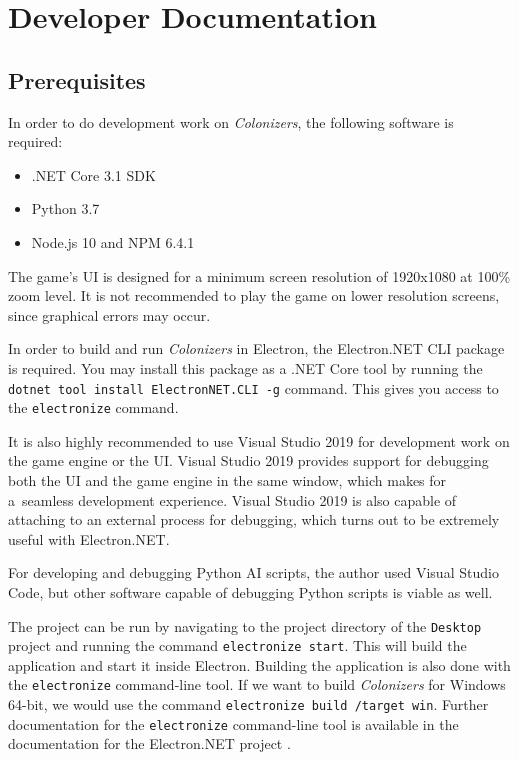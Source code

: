 \section{Developer Documentation}
\label{sec:devdocs} 

\subsection{Prerequisites}

In order to do development work on \emph{Colonizers}, the following software
is required:
\begin{itemize}
    \item .NET Core 3.1 SDK
    \item Python 3.7
    \item Node.js 10 and NPM 6.4.1
\end{itemize}
The game's UI is designed for a minimum screen resolution of 1920x1080 at
100\% zoom level. It is not recommended to play the game on lower resolution
screens, since graphical errors may occur.

In order to build and run \emph{Colonizers} in Electron, the Electron.NET CLI
package is required. You may install this package as a .NET Core tool by running
the \texttt{dotnet tool install ElectronNET.CLI -g} command. This gives you
access to the \texttt{electronize} command.

It is also highly recommended to use Visual Studio 2019 for development work
on the game engine or the UI. Visual Studio 2019 provides support for debugging
both the UI and the game engine in the same window, which makes for a~seamless
development experience. Visual Studio 2019 is also capable of attaching
to an external process for debugging, which turns out to be
extremely useful with Electron.NET.

For developing and debugging Python AI scripts, the author used Visual Studio Code,
but other software capable of debugging Python scripts is viable as well.

The project can be run by navigating to the project directory of the \texttt{Desktop} project
and running the command \texttt{electronize start}. This will build the application
and start it inside Electron. Building the application is also done with the
\texttt{electronize} command-line tool. If we want to build \emph{Colonizers}
for Windows 64-bit, we would use the command \texttt{electronize build /target win}.
Further documentation for the \texttt{electronize} command-line tool
is available in the documentation for the Electron.NET project \cite{Electronnet}.

